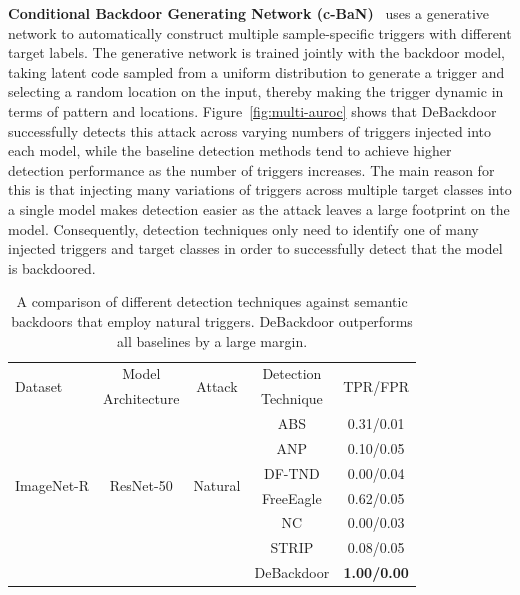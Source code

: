 \documentclass[letterpaper,twocolumn,10pt]{article}
\begin{document}
\textbf{Conditional Backdoor Generating Network (c-BaN)}~\cite{salem2022dynamic} uses a generative network to automatically construct multiple sample-specific triggers with different target labels. The generative network is trained jointly with the backdoor model, taking latent code sampled from a uniform distribution to generate a trigger and selecting a random location on the input, thereby making the trigger dynamic in terms of pattern and locations. Figure~\ref{fig:multi-auroc} shows that DeBackdoor successfully detects this attack across varying numbers of triggers injected into each model, while the baseline detection methods tend to achieve higher detection performance as the number of triggers increases. The main reason for this is that injecting many variations of triggers across multiple target classes into a single model makes detection easier as the attack leaves a large footprint on the model. Consequently, detection techniques only need to identify one of many injected triggers and target classes in order to successfully detect that the model is backdoored.

\begin{table}[t]
\small
\setlength{\tabcolsep}{4pt}
\caption{A comparison of different detection techniques against semantic backdoors that employ natural triggers. DeBackdoor outperforms all baselines by a large margin.}
\label{tab:natural-trigger}
\centering
\begin{tabular}{l c c c c}
\toprule
\multirow{2}{*}{Dataset} & Model & \multirow{2}{*}{Attack} & Detection & \multirow{2}{*}{TPR/FPR} \\
 & Architecture & & Technique & \\
\midrule
\multirow{6}{*}{ImageNet-R} & \multirow{6}{*}{ResNet-50} & \multirow{6}{*}{Natural} & ABS & 0.31/0.01 \\
& & & ANP & 0.10/0.05 \\
& & & DF-TND & 0.00/0.04 \\
& & & FreeEagle & 0.62/0.05 \\
& & & NC & 0.00/0.03 \\
& & & STRIP & 0.08/0.05 \\
& & & DeBackdoor & \textbf{1.00/0.00} \\
 
\bottomrule
\end{tabular}
\end{table}
\end{document}
